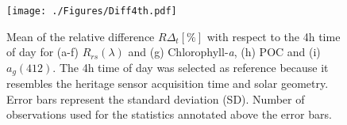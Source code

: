 \documentclass[onecolumn,3p,letterpaper,11pt]{elsarticle}
\begin{document}
\begin{figure}[H]
  \centering
  \texttt{[image: ./Figures/Diff4th.pdf]}
    \caption{Mean of the relative difference $R\Delta_t[\%]$ with respect to the 4h time of day for (a-f) $R_{rs}(\lambda)$ and (g) Chlorophyll-{\it a}, (h) POC and (i) $a_g(412)$. The 4h time of day was selected as reference because it resembles the heritage sensor acquisition time and solar geometry. Error bars represent the standard deviation (SD). Number of observations used for the statistics annotated above the error bars. \label{fig:Diff4th} } 
\end{figure}
\end{document}

